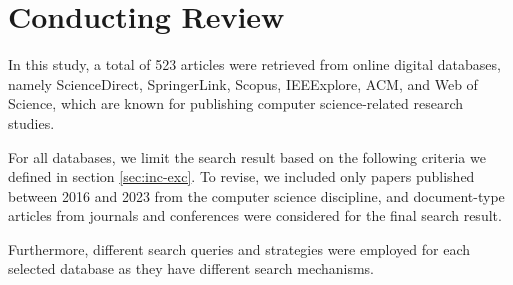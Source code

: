 \section{Conducting Review}

In this study, a total of 523 articles were retrieved from online digital databases, namely ScienceDirect, SpringerLink, Scopus, IEEExplore, ACM, and Web of Science, which are known for publishing computer science-related research studies.

For all databases, we limit the search result based on the following criteria we defined in section \ref{sec:inc-exc}. To revise, we included only papers published between 2016 and 2023 from the computer science discipline, and document-type articles from journals and conferences were considered for the final search result.

Furthermore, different search queries and strategies were employed for each selected database as they have different search mechanisms. 










